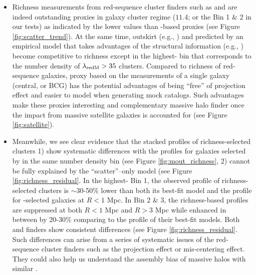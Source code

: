 \documentclass[a4paper,fleqn,usenatbib]{mnras}
\begin{document}
\begin{itemize}
        \item Richness measurements from red-sequence cluster finders such as \redm{} and \camira{} 
            are indeed outstanding \mvir{} proxies in galaxy cluster regime 
            (\logmh{}$11.4$; or the Bin 1 \& 2 in our tests) as indicated by the lower 
            \sigmh{} values than \mstar{}-based proxies (see Figure \ref{fig:scatter_trend}).
            At the same time, outskirt \mstar{} (e.g., ) and \mvir{} predicted 
            by an empirical model that takes advantages of the structural information (e.g.,
            \masap{}) become competitive to richness except in the highest-\mvir{} bin that 
            corresponds to the number density of $\lambda_{\rm redM} > 35$ clusters.
            Compared to richness of red-sequence galaxies, \mvir{} proxy based on the \mstar{}
            measurements of a single galaxy (central, or BCG) has the potential advantages of
            being ``free'' of projection effect and easier to model when generating mock catalogs.
            Such advantages make these proxies interesting and complementary massive halo finder 
            once the impact from massive satellite galaxies is accounted for 
            (see Figure \ref{fig:satellite}).
        
        \item Meanwhile, we see clear evidence that the stacked \dsigma{} profiles of 
            richness-selected clusters 
            1) show systematic differences with the profiles for 
            galaxies selected by \mstar{} in the same number density bin
            (see Figure \ref{fig:mout_richness},
            2) cannot be fully explained by the ``scatter''--only model
            (see Figure \ref{fig:richness_residual}.
            In the highest-\mvir{} Bin 1, the observed \dsigma{} profile of richness-selected 
            clusters is $\sim 30$-50\% lower than both its best-fit model and the profile for 
            -selected galaxies at $R < 1$ Mpc.
            In Bin 2 \& 3, the richness-based \dsigma{} profiles are suppressed at both 
            $R < 1$ Mpc and $R > 3$ Mpc while enhanced in between by 20-30\% comparing to 
            the \dsigma{} profile of their best-fit models.
            Both \redm{} and \camira{} finders show consistent differences
            (see Figure \ref{fig:richness_residual}. 
            Such differences can arise from a series of systematic issues of the red-sequence 
            cluster finders such as the projection effect or mis-centering effect. 
            They could also help us understand the assembly bias of massive halos with 
            similar \mvir{}.

    \end{itemize}
\end{document}
